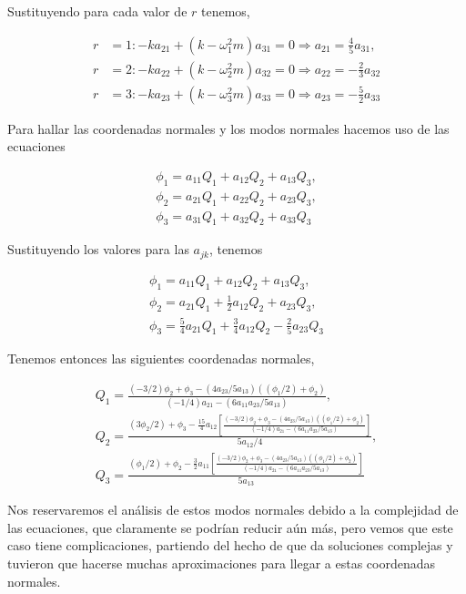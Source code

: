 \documentclass[a4paper,10pt]{article}
\numberwithin{equation}{section}
\begin{document}
Sustituyendo para cada valor de $r$ tenemos,

\begin{align}
 r &= 1: -ka_{21} + (k - \omega_1^2m)a_{31} = 0 \Rightarrow  
 a_{21} =\frac{4}{5}a_{31},\\
 r &= 2: -ka_{22} + (k - \omega_2^2m)a_{32} = 0 \Rightarrow 
 a_{22} = -\frac{2}{3}a_{32}\\
 r &= 3: -ka_{23} + (k - \omega_3^2m)a_{33} = 0 \Rightarrow 
 a_{23} = - \frac{5}{2}a_{33}
\end{align}

Para hallar las coordenadas normales y los modos normales hacemos uso de las ecuaciones 

\begin{align}
 \phi_1 = a_{11}Q_1 + a_{12}Q_2 + a_{13}Q_3, \\
 \phi_2 = a_{21}Q_1 + a_{22}Q_2 + a_{23}Q_3, \\
 \phi_3 = a_{31}Q_1 + a_{32}Q_2 + a_{33}Q_3
\end{align}

Sustituyendo los valores para las $a_{jk}$, tenemos 

\begin{align}
 \phi_1 = a_{11}Q_1 + a_{12}Q_2 + a_{13}Q_3, \\
 \phi_2 = a_{21}Q_1 + \frac{1}{2}a_{12}Q_2 + a_{23}Q_3, \\
 \phi_3 = \frac{5}{4}a_{21}Q_1 + \frac{3}{4}a_{12}Q_2 - \frac{2}{5}a_{23}Q_3
\end{align}

Tenemos entonces las siguientes coordenadas normales,

\begin{align}
 Q_1 = \frac{(-3/2)\phi_2 + \phi_3 - (4a_{23}/5a_{13})((\phi_1/2)+\phi_2)}{(-1/4)a_{21} 
 - (6a_{11}a_{23}/5a_{13})}, \\
 Q_2 =  \frac{(3\phi_2/2)+\phi_3 - \frac{15}{4}a_{12}\left[ \frac{(-3/2)\phi_2 + \phi_3 - (4a_{23}/5a_{13})((\phi_1/2)+\phi_2)}{(-1/4)a_{21} 
 - (6a_{11}a_{23}/5a_{13})}\right]}{5a_{12}/4},\\
 Q_3 = \frac{(\phi_1/2)+\phi_2 - \frac{3}{2}a_{11}\left[\frac{(-3/2)\phi_2 + \phi_3 - (4a_{23}/5a_{13})((\phi_1/2)+\phi_2)}{(-1/4)a_{21} 
 - (6a_{11}a_{23}/5a_{13})} \right]}{5a_{13}}
\end{align}

Nos reservaremos el análisis de estos modos normales debido a la complejidad de 
las ecuaciones, que claramente se podrían reducir aún más, pero vemos que este caso 
tiene complicaciones, partiendo del hecho de que da soluciones complejas y tuvieron 
que hacerse muchas aproximaciones para llegar a estas coordenadas normales.
\end{document}

